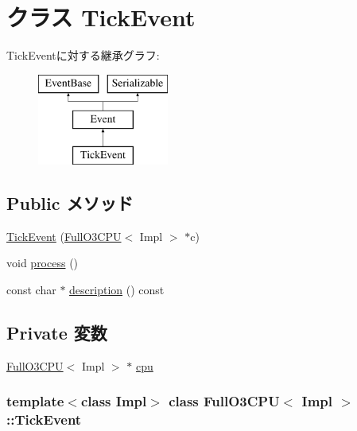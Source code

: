 \hypertarget{classFullO3CPU_1_1TickEvent}{
\section{クラス TickEvent}
\label{classFullO3CPU_1_1TickEvent}
}
TickEventに対する継承グラフ:\begin{figure}[H]
\begin{center}
\leavevmode
\includegraphics[height=3cm]{classFullO3CPU_1_1TickEvent}
\end{center}
\end{figure}
\subsection*{Public メソッド}
\begin{DoxyCompactItemize}
\item 
\hyperlink{classFullO3CPU_1_1TickEvent_ac68e05215075fac41ae8e454d9dfd97a}{TickEvent} (\hyperlink{classFullO3CPU}{FullO3CPU}$<$ Impl $>$ $\ast$c)
\item 
void \hyperlink{classFullO3CPU_1_1TickEvent_a2e9c5136d19b1a95fc427e0852deab5c}{process} ()
\item 
const char $\ast$ \hyperlink{classFullO3CPU_1_1TickEvent_a5a14fe478e2393ff51f02e9b7be27e00}{description} () const 
\end{DoxyCompactItemize}
\subsection*{Private 変数}
\begin{DoxyCompactItemize}
\item 
\hyperlink{classFullO3CPU}{FullO3CPU}$<$ Impl $>$ $\ast$ \hyperlink{classFullO3CPU_1_1TickEvent_a3a3767255bcefd2ce55f94976ab8eb99}{cpu}
\end{DoxyCompactItemize}
\subsubsection*{template$<$class Impl$>$ class FullO3CPU$<$ Impl $>$::TickEvent}



